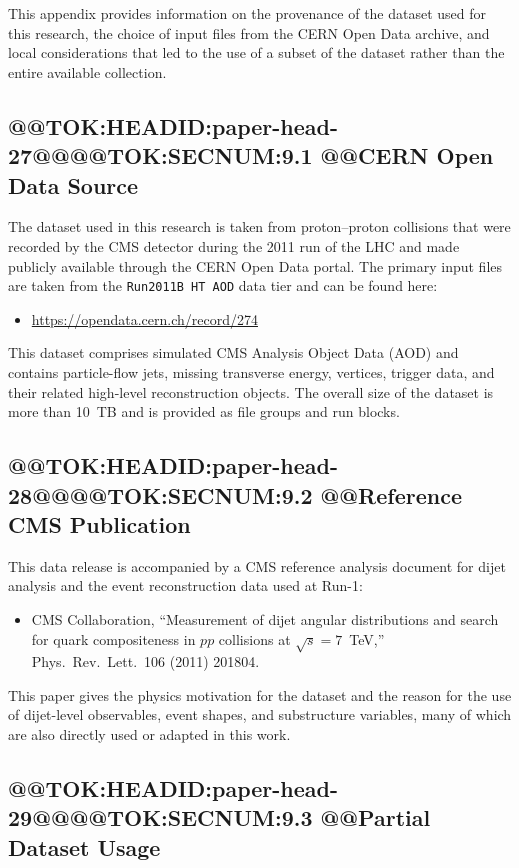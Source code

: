 \documentclass[11pt]{article}
\begin{document}
This appendix provides information on the provenance of the dataset used for this research, the choice of input files from the CERN Open Data archive, and local considerations that led to the use of a subset of the dataset rather than the entire available collection.

\subsection{@@TOK:HEADID:paper-head-27@@@@TOK:SECNUM:9.1 @@CERN Open Data Source}

The dataset used in this research is taken from proton--proton collisions that were recorded by the CMS detector during the 2011 run of the LHC and made publicly available through the CERN Open Data portal. The primary input files are taken from the \texttt{Run2011B HT AOD} data tier and can be found here:
\begin{itemize}
    \item \url{https://opendata.cern.ch/record/274}
\end{itemize}

This dataset comprises simulated CMS Analysis Object Data (AOD) and contains particle-flow jets, missing transverse energy, vertices, trigger data, and their related high-level reconstruction objects. The overall size of the dataset is more than 10~TB and is provided as file groups and run blocks.

\subsection{@@TOK:HEADID:paper-head-28@@@@TOK:SECNUM:9.2 @@Reference CMS Publication}

This data release is accompanied by a CMS reference analysis document for dijet analysis and the event reconstruction data used at Run-1:
\begin{itemize}
    \item CMS Collaboration, ``Measurement of dijet angular distributions and search for quark compositeness in $pp$ collisions at $\sqrt{s}=7$~TeV,'' Phys.\ Rev.\ Lett.\ 106 (2011) 201804.
\end{itemize}

This paper gives the physics motivation for the dataset and the reason for the use of dijet-level observables, event shapes, and substructure variables, many of which are also directly used or adapted in this work.

\subsection{@@TOK:HEADID:paper-head-29@@@@TOK:SECNUM:9.3 @@Partial Dataset Usage}
\end{document}
